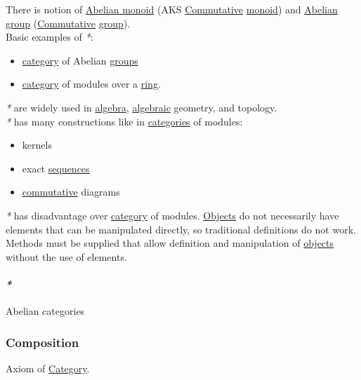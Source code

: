 \documentclass[11pt]{article}
\begin{document}
There is notion of \hyperref[orgcb93f93]{Abelian monoid} (AKS \hyperref[orgcb2a02d]{Commutative} \hyperref[org8ff50ea]{monoid}) and \hyperref[org079b4e5]{Abelian group} (\hyperref[orgcb2a02d]{Commutative} \hyperref[org9ef38ed]{group}).\\

Basic examples of \emph{*}:\\
\begin{itemize}
\item \hyperref[org3e3a79b]{category} of Abelian \hyperref[org7292335]{groups}\\
\item \hyperref[org3e3a79b]{category} of modules over a \hyperref[org3db5758]{ring}.\\
\end{itemize}

\emph{*} are widely used in \hyperref[orgecde2fc]{algebra}, \hyperref[orgf3466c3]{algebraic} geometry, and topology.\\

\emph{*} has many constructions like in \hyperref[org43ea200]{categories} of modules:\\
\begin{itemize}
\item kernels\\
\item exact \hyperref[orgf15dce2]{sequences}\\
\item \hyperref[orgcb2a02d]{commutative} diagrams\\
\end{itemize}

\emph{*} has disadvantage over \hyperref[org3e3a79b]{category} of modules. \hyperref[orge0f000f]{Objects} do not necessarily have elements that can be manipulated directly, so traditional definitions do not work. Methods must be supplied that allow definition and manipulation of \hyperref[orge0f000f]{objects} without the use of elements.\\

\paragraph{\emph{*}}
\label{sec:orga9f585f}

\label{orgf0bcdf5}Abelian categories\\

\subsubsection{\label{org24a8abd}Composition}
\label{sec:org83565ba}
Axiom of \hyperref[org3e3a79b]{Category}.\\
\end{document}

